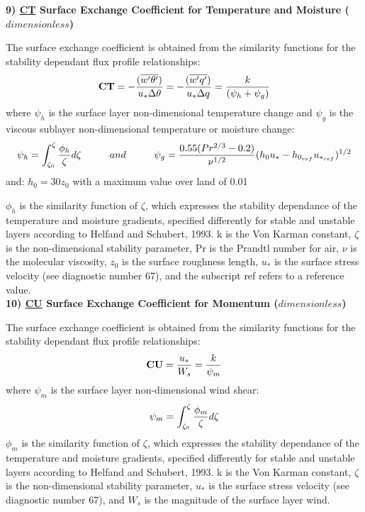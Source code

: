 \noindent
{\bf 9)  \underline {CT}  Surface Exchange Coefficient for Temperature and Moisture ($dimensionless$) }

\noindent
The surface exchange coefficient is obtained from the similarity functions for the stability
 dependant flux profile relationships:
\[
{\bf CT} = -{( {\overline{w^{\prime}\theta^{\prime}}}) \over {u_* \Delta \theta }} = 
-{( {\overline{w^{\prime}q^{\prime}}}) \over {u_* \Delta q }} = 
{ k \over { (\psi_{h} + \psi_{g}) } } 
\]
where $\psi_h$ is the surface layer non-dimensional temperature change and $\psi_g$ is the
viscous sublayer non-dimensional temperature or moisture change:
\[
\psi_{h} = {\int_{\zeta_{0}}^{\zeta} {\phi_{h} \over \zeta} d \zeta} \hspace{1cm} and 
\hspace{1cm} \psi_{g} = { 0.55 (Pr^{2/3} - 0.2) \over \nu^{1/2} } 
(h_{0}u_{*} - h_{0_{ref}}u_{*_{ref}})^{1/2}
\]
and:
$h_{0} = 30z_{0}$ with a maximum value over land of 0.01

\noindent
$\phi_h$ is the similarity function of $\zeta$, which expresses the stability dependance of
the temperature and moisture gradients, specified differently for stable and unstable 
layers according to Helfand and Schubert, 1993. k is the Von Karman constant, $\zeta$ is the 
non-dimensional stability parameter, Pr is the Prandtl number for air, $\nu$ is the molecular 
viscosity, $z_{0}$ is the surface roughness length, $u_*$ is the surface stress velocity 
(see diagnostic number 67), and the subscript ref refers to a reference value.
\\

\noindent
{\bf 10)  \underline {CU}  Surface Exchange Coefficient for Momentum ($dimensionless$) }

\noindent
The surface exchange coefficient is obtained from the similarity functions for the stability
 dependant flux profile relationships:
\[
{\bf CU} = {u_* \over W_s} = { k \over \psi_{m} } 
\]
where $\psi_m$ is the surface layer non-dimensional wind shear: 
\[
\psi_{m} = {\int_{\zeta_{0}}^{\zeta} {\phi_{m} \over \zeta} d \zeta}
\]
\noindent
$\phi_m$ is the similarity function of $\zeta$, which expresses the stability dependance of
the temperature and moisture gradients, specified differently for stable and unstable layers
according to Helfand and Schubert, 1993. k is the Von Karman constant, $\zeta$ is the 
non-dimensional stability parameter, $u_*$ is the surface stress velocity 
(see diagnostic number 67), and $W_s$ is the magnitude of the surface layer wind.
\\

